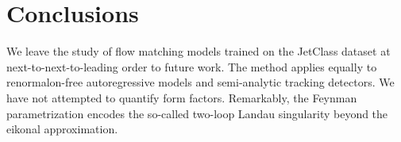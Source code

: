 \section{Conclusions}\label{sec:conclusions}

We leave the study of flow matching models trained on the JetClass
dataset at next-to-next-to-leading order to future work. The method
applies equally to renormalon-free autoregressive models and
semi-analytic tracking detectors. We have not attempted to quantify form
factors. Remarkably, the Feynman parametrization encodes the so-called
two-loop Landau singularity beyond the eikonal approximation.

